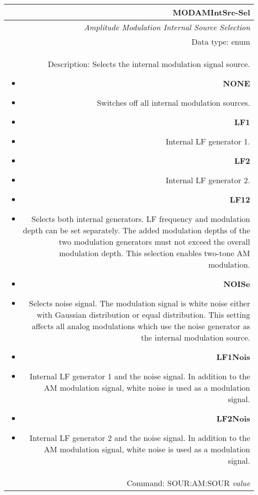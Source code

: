 \documentclass[openany]{article}
\begin{document}
		\begin{tabular}{N}
			\hline
			\bfseries MODAMIntSrc-Sel \\ \hline
			\emph{Amplitude Modulation Internal Source Selection} \\
			Data type: enum \\  
			Description: Selects the internal modulation signal source.\begin{itemize}[noitemsep]
				\small
				\item[] \textbf{NONE}
				\item[] Switches off all internal modulation sources.
				\item[] \textbf{LF1}
				\item[]	Internal LF generator 1.
				\item[] \textbf{LF2} 
				\item[]	Internal LF generator 2.
				\item[] \textbf{LF12} 
				\item[]	Selects both internal generators. LF frequency and modulation depth can be set separately. The added modulation depths of the two modulation generators must not exceed the overall modulation depth. This selection enables two-tone AM modulation.
				\item[] \textbf{NOISe} 
				\item[]	Selects noise signal. The modulation signal is white noise either with Gaussian distribution or equal distribution. This setting affects all analog modulations which use the noise generator as the internal modulation source.
				\item[] \textbf{LF1Nois} 
				\item[]	Internal LF generator 1 and the noise signal. In addition to the AM modulation signal, white noise is used as a modulation signal.
				\item[] \textbf{LF2Nois} 
				\item[]	Internal LF generator 2 and the noise signal. In addition to the AM modulation signal, white noise is used as a modulation signal.

			\end{itemize} \\
			Command: SOUR:AM:SOUR \emph{value} \\

		\end{tabular}
\end{document}

